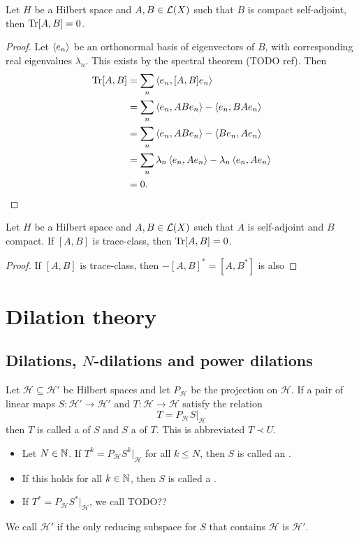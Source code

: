 \begin{proposition} \label{traceCommutatorCompactSA}
Let $H$ be a Hilbert space and $A,B\in\operatorname{\mathcal{L}}(X)$ such that $B$ is compact self-adjoint, then $\operatorname{Tr}[A,B] = 0$.
\end{proposition}
\begin{proof}
Let $\left\langle e_n \right\rangle$ be an orthonormal basis of eigenvectors of $B$, with corresponding real eigenvalues $\lambda_n$. This exists by the spectral theorem (TODO ref). Then
\begin{align*}
\operatorname{Tr}[A,B] &= \sum_n\left\langle e_n, [A,B]e_n \right\rangle \\
&= \sum_n\left\langle e_n, ABe_n \right\rangle - \left\langle e_n, BAe_n \right\rangle \\
&= \sum_n\left\langle e_n, ABe_n \right\rangle - \left\langle Be_n, Ae_n \right\rangle \\
&= \sum_n\lambda_n\left\langle e_n, Ae_n \right\rangle - \lambda_n\left\langle e_n, Ae_n \right\rangle \\
&= 0.
\end{align*}
\end{proof}
\begin{corollary}
Let $H$ be a Hilbert space and $A,B\in\operatorname{\mathcal{L}}(X)$ such that $A$ is self-adjoint and $B$ compact. If $[A,B]$ is trace-class, then $\operatorname{Tr}[A,B] = 0$.
\end{corollary}
\begin{proof}
If $[A,B]$ is trace-class, then $-[A,B]^* = [A,B^*]$ is also 
\end{proof}


\section{Dilation theory}
\subsection{Dilations, $N$-dilations and power dilations}
\begin{definition}
Let $\mathcal{H} \subseteq \mathcal{H}'$ be Hilbert spaces and let $P_\mathcal{H}$ be the projection on $\mathcal{H}$. If a pair of linear maps $S: \mathcal{H}'\to\mathcal{H}'$ and $T: \mathcal{H}\to \mathcal{H}$ satisfy the relation
\[ T = P_\mathcal{H} S |_\mathcal{H} \]
then $T$ is called a  of $S$ and $S$ a  of $T$. This is abbreviated $T\prec U$.

\begin{itemize}
\item Let $N\in\mathbb{N}$. If $T^k = P_\mathcal{H} S^k |_\mathcal{H}$ for all $k\leq N$, then $S$ is called an .
\item If this holds for all $k\in\mathbb{N}$, then $S$ is called a .
\item If $T^* = P_\mathcal{H} S^* |_\mathcal{H}$, we call TODO??
\end{itemize}
We call $\mathcal{H}'$  if the only reducing subspace for $S$ that contains $\mathcal{H}$ is $\mathcal{H}'$.
\end{definition}

